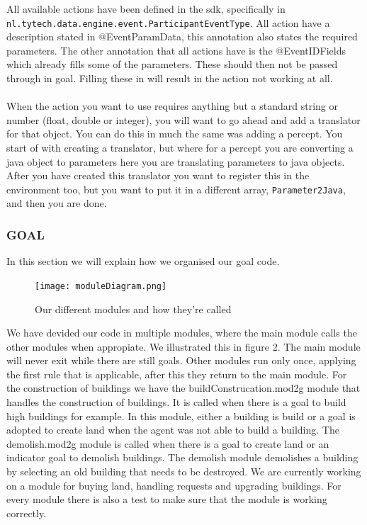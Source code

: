 All available actions have been defined in the sdk, specifically in \\\verb|nl.tytech.data.engine.event.ParticipantEventType|. 
All action have a description stated in @EventParamData, this annotation also states the required parameters. 
The other annotation that all actions have is the @EventIDFields which already fills some of the parameters. 
These should then not be passed through in goal. 
Filling these in will result in the action not working at all.\\
\\
When the action you want to use requires anything but a standard string or number (float, double or integer), you will want to go ahead and add a translator for that object.
You can do this in much the same was adding a percept.
You start of with creating a translator, but where for a percept you are converting a java object to parameters here you are translating parameters to java objects.
After you have created this translator you want to register this in the environment too, but you want to put it in a different array, \verb|Parameter2Java|, and then you are done.

\subsubsection{GOAL}

In this section we will explain how we organised our goal code.
\begin{figure}[h!]
\texttt{[image: moduleDiagram.png]}
\caption{Our different modules and how they're called}
\label{fig:Modules}
\end{figure}
We have devided our code in multiple modules, where the main module calls the other modules when appropiate. We illustrated this in figure 2.
The main module will never exit while there are still goals. Other modules run only once, applying the first rule that is applicable, after this they return to the main module.
For the construction of buildings we have the buildConstrucation.mod2g module that handles the construction of buildings. It is called when there is a goal to build high buildings for example. In this module, either a building is build or a goal is adopted to create land when the agent was not able to build a building.
The demolish.mod2g module is called when there is a goal to create land or an indicator goal to demolish buildings. The demolish module demolishes a building by selecting an old building that needs to be destroyed. We are currently working on a module for buying land, handling requests and upgrading buildings.
For every module there is also a test to make sure that the module is working correctly.

